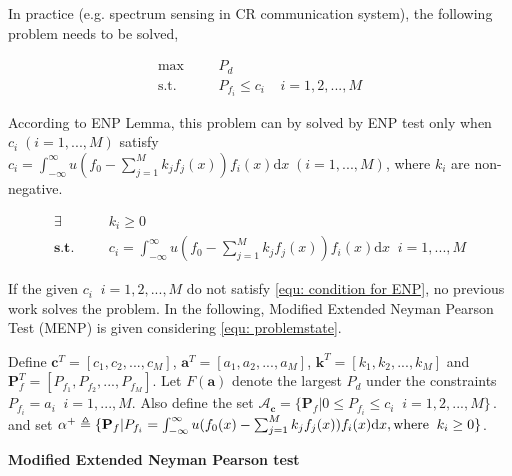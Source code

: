 \documentclass[12pt,journal,a4paper,twoside,onecolumn]{IEEEtran}
\begin{document}
\begin{spacing}{2.5}
In practice (e.g. spectrum sensing in CR communication system), the following problem needs to be solved,

      \begin{equation}
      \label{equ: problemstate}
      \begin{split}
      \max\;\;\;\;\;\;&P_d\\
      \text{s.t.}\;\;\;\;\;\;&P_{f_i} \leq c_i\;\;\;\;i = 1, 2, ..., M
      \end{split}
      \end{equation}

According to ENP Lemma, this problem can by solved by ENP test only when  $c_i \;(i = 1, ..., M)$ satisfy $c_i = \int_{-\infty}^{\infty}u(f_0 - \sum_{j=1}^{M}k_jf_j(x))f_i(x)\mathrm{d}x \;(i=1, ..., M)$, where $k_i$ are non-negative.

\begin{equation}
\label{equ: condition for ENP}
\begin{split}
\exists\;\;\;\;\;\;\;&k_i \geq 0\\
\textbf{s.t.}\;\;\;\;\;\;&c_i = \int_{-\infty}^{\infty}u(f_0 - \sum_{j=1}^{M}k_jf_j(x))f_i(x)\mathrm{d}x \;\;i = 1, ..., M
\end{split}
\end{equation}

If the given $c_i\;\;i = 1, 2, ..., M$ do not satisfy \eqref{equ: condition for ENP}, no previous work solves the problem. In the following, Modified Extended Neyman Pearson Test (MENP) is given considering \eqref{equ: problemstate}.

\def \JUDGEMENT{u(f_0(x) - \sum_{j=1}^{M}k_j f_j(x))}

Define $\mathbf{c}^T = [c_1, c_2, ..., c_M]$, $\mathbf{a}^T=[a_1, a_2, ..., a_M]$, $\mathbf{k}^T = [k_1, k_2, ..., k_M]$ and  $\mathbf{P}_f^T = [P_{f_1}, P_{f_2}, ..., P_{f_M}]$. Let
$F(\mathbf{a})$ denote the largest $P_d$ under the constraints $P_{f_i} = a_i\;\;i = 1, ..., M$.
Also define the set $\mathcal{A}_\mathbf{c} = \{
  \mathbf{P}_f | 0 \leq P_{f_i} \leq c_i
  \;\;i=1, 2, ..., M\}\,.
$ and set $\alpha^+ \triangleq \{\mathbf{P}_f | P_{f_i} = \int_{-\infty}^{\infty} \JUDGEMENT f_i(x) \mathrm{d}x, \text{where\;\;} k_i \geq 0\}$.

\noindent \textbf{Modified Extended Neyman Pearson test}


\end{spacing}
\end{document}
